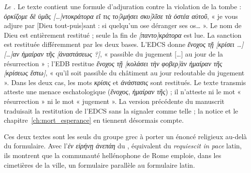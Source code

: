 \emph{Le .} Le texte contient une formule d’adjuration contre la violation de la tombe : \emph{ὁρκίζομε δὲ ὑμᾶς […]ντοκράτορα εἴ τις το[λμήσει σκυ]λῖσε τὰ ὀστέα αὐτοῦ}, « je vous adjure par [Dieu tout-puis]sant : si quelqu’un ose déranger ses os… ». Le nom de Dieu est entièrement restitué ; seule la fin de \emph{[παντο]κράτορα} est lue. La sanction est restituée différemment par les deux bases. L’EDCS donne \emph{ἔνοχος τῇ [κρίσει …] […]αν ἡμαίραν τῆς [ἀναστάσεως ?]}, « passible du jugement […] au jour de la résurrection » ; l’EDB restitue \emph{ἔνοχος τῇ [κολάσει τὴν φοβερ]ὰν ἡμαίραν τῆς [κρίσεως ἔστω]}, « qu’il soit passible du châtiment au jour redoutable du jugement ». Dans les deux cas, les mots \emph{κρίσις} et \emph{ἀνάστασις} sont restitués. Le texte transmis atteste une menace eschatologique (\emph{ἔνοχος}, \emph{ἡμαίραν τῆς}) ; il n’atteste ni le mot « résurrection » ni le mot « jugement ». La version précédente du manuscrit traduisait la restitution de l’EDCS sans la signaler comme telle ; la notice et le chapitre~\ref{ch:mort_esperance} en tiennent désormais compte.

Ces deux textes sont les seuls du groupe grec à porter un énoncé religieux au-delà du formulaire. Avec l’\emph{ἐν εἰρήνῃ ἀνεπάη} du , équivalent du \emph{requiescit in pace} latin, ils montrent que la communauté hellénophone de Rome emploie, dans les cimetières de la ville, un formulaire parallèle au formulaire latin.
